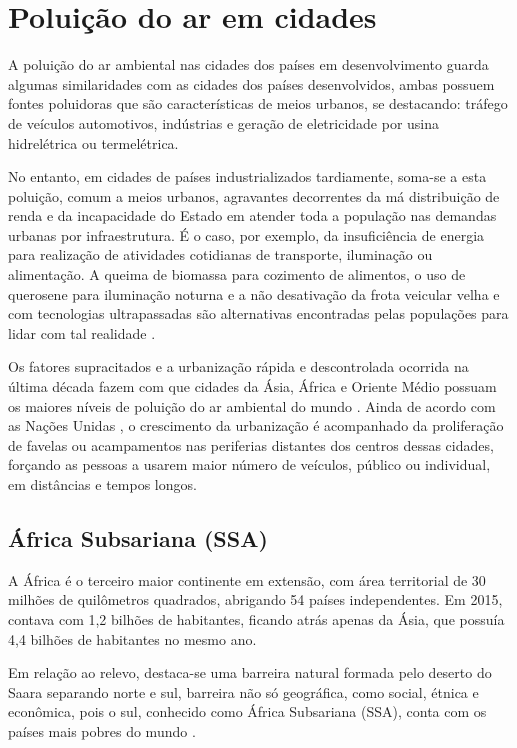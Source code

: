 \section{Poluição do ar em cidades}

A poluição do ar ambiental nas cidades dos países em desenvolvimento
guarda algumas similaridades com as cidades dos países desenvolvidos,
ambas possuem fontes poluidoras que são características de meios urbanos, 
se destacando: tráfego de veículos automotivos, indústrias e geração de
eletricidade por usina hidrelétrica ou termelétrica.

No entanto, em cidades de países industrializados tardiamente, soma-se a esta 
poluição, comum a meios urbanos, agravantes decorrentes da má distribuição de 
renda e da incapacidade do Estado em atender toda a população nas demandas urbanas 
por infraestrutura. É o caso, por exemplo, da insuficiência de energia para 
realização de atividades cotidianas de transporte, iluminação ou alimentação. 
A queima de biomassa para cozimento de alimentos, o uso de querosene para 
iluminação noturna e a não desativação da frota veicular velha e com tecnologias 
ultrapassadas são alternativas encontradas pelas populações para lidar 
com tal realidade \citep{brauer2012}.

Os fatores supracitados e a urbanização rápida e descontrolada ocorrida na
última década fazem com que cidades da Ásia, África e Oriente 
Médio possuam os maiores níveis de poluição do ar ambiental do mundo 
\citep{brauer2012}. Ainda de acordo com as Nações Unidas \citeyearpar{UN}, 
o crescimento da urbanização é acompanhado 
da proliferação de favelas ou acampamentos nas periferias distantes dos centros
dessas cidades, forçando as pessoas a usarem maior número de veículos, público
ou individual, em distâncias e tempos longos. 
	
\subsection{África Subsariana (SSA)}

A África é o terceiro maior continente em extensão, com área territorial 
de 30 milhões de quilômetros quadrados, abrigando 54 países independentes. 
Em 2015, contava com 1,2 bilhões de habitantes, ficando atrás 
apenas da Ásia, que possuía 4,4 bilhões de habitantes no mesmo ano.
 
Em relação ao relevo, destaca-se uma barreira natural formada pelo deserto do 
Saara separando norte e sul, barreira não só geográfica, como social, étnica 
e econômica, pois o sul, conhecido como África Subsariana (SSA), 
conta com os países mais pobres do mundo \citep{UN}. 

